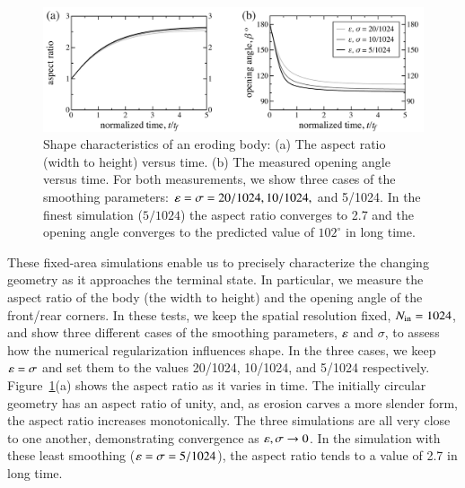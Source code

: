 \documentclass[preprint, 10pt]{elsarticle}
\begin{document}
\begin{figure}%
\begin{center}
\includegraphics[width = 0.85 \textwidth]{./figs/arangle.pdf}
\caption{Shape characteristics of an eroding body: (a) The aspect ratio (width to height) versus time. (b) The measured opening angle versus time. For both measurements, we show three cases of the smoothing parameters: $\varepsilon = \sigma = 20/1024, 10/1024,$ and 5/1024. In the finest simulation ($5/1024$) the aspect ratio converges to 2.7 and the opening angle converges to the predicted value of $102^{\circ}$ in long time.}
\label{fig:arangle}
\end{center}
\end{figure}

	These fixed-area simulations enable us to precisely characterize the changing geometry as it approaches the terminal state. In particular, we measure the aspect ratio of the body (the width to height) and the opening angle of the front/rear corners. In these tests, we keep the spatial resolution fixed, $N_{\mathrm{in}} = 1024$, and show three different cases of the smoothing parameters, $\varepsilon$ and $\sigma$, to assess how the numerical regularization influences shape. In the three cases, we keep $\varepsilon = \sigma$ and set them to the values 20/1024, 10/1024, and 5/1024 respectively. Figure~\ref{fig:arangle}(a) shows the aspect ratio as it varies in time. The initially circular geometry has an aspect ratio of unity, and, as erosion carves a more slender form, the aspect ratio increases monotonically. The three simulations are all very close to one another, demonstrating convergence as $\varepsilon, \sigma \to 0$. In the simulation with these least smoothing ($\varepsilon = \sigma = 5/1024$), the aspect ratio tends to a value of 2.7 in long time.
\end{document}
